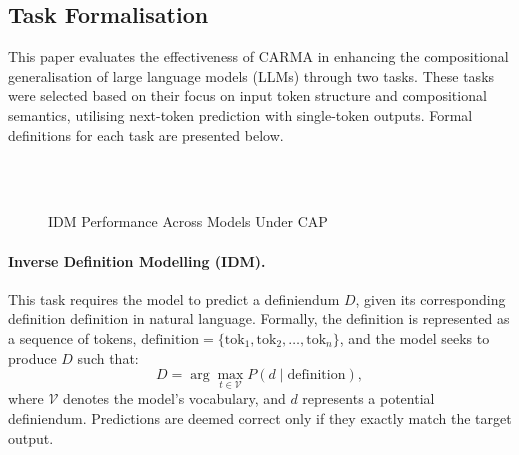 \subsection{Task Formalisation}\label{sec:task_formalisation}
This paper evaluates the effectiveness of CARMA in enhancing the compositional generalisation of large language models (LLMs) through two tasks. These tasks were selected based on their focus on input token structure and compositional semantics, utilising next-token prediction with single-token outputs. Formal definitions for each task are presented below.
\begin{figure*}
    \centering
     \\
     \\
    \caption{IDM Performance Across Models Under CAP}
    \label{fig:idm_models}
\end{figure*}

\noindent\paragraph{Inverse Definition Modelling (IDM).}  
This task requires the model to predict a definiendum \(D\), given its corresponding definition \(\text{definition}\) in natural language. Formally, the definition is represented as a sequence of tokens, \(\text{definition} = \{\text{tok}_1, \text{tok}_2, \dots, \text{tok}_n\}\), and the model seeks to produce \(D\) such that:  
\begin{equation}
    D = \arg\max_{t \in \mathcal{V}} P(d \mid \text{definition}),
\end{equation} 
where \(\mathcal{V}\) denotes the model's vocabulary, and \(d\) represents a potential definiendum. Predictions are deemed correct only if they exactly match the target output.

